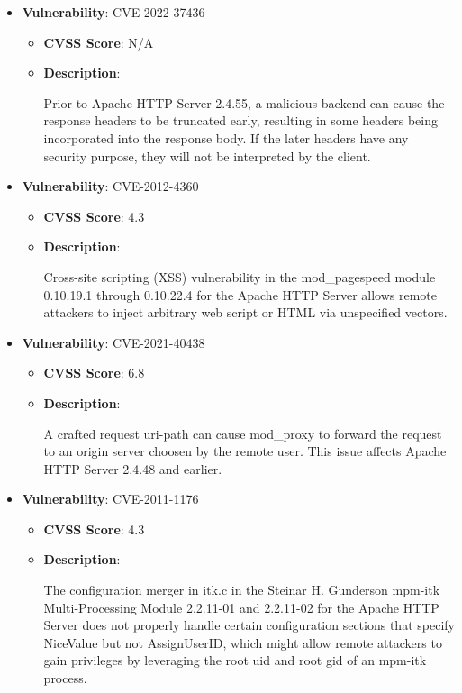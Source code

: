 \documentclass{article}
\begin{document}
\begin{itemize}
        \item \textbf{Vulnerability}: CVE-2022-37436
        \begin{itemize}
            \item \textbf{CVSS Score}:  N/A 
            \item \textbf{Description}:
            \parbox[t]{0.9\linewidth}{
                \ttfamily Prior to Apache HTTP Server 2.4.55, a malicious backend can cause the response headers to be truncated early, resulting in some headers being incorporated into the response body. If the later headers have any security purpose, they will not be interpreted by the client.
            }
        \end{itemize}
    
        \item \textbf{Vulnerability}: CVE-2012-4360
        \begin{itemize}
            \item \textbf{CVSS Score}:  4.3 
            \item \textbf{Description}:
            \parbox[t]{0.9\linewidth}{
                \ttfamily Cross-site scripting (XSS) vulnerability in the mod\_pagespeed module 0.10.19.1 through 0.10.22.4 for the Apache HTTP Server allows remote attackers to inject arbitrary web script or HTML via unspecified vectors.
            }
        \end{itemize}
    
        \item \textbf{Vulnerability}: CVE-2021-40438
        \begin{itemize}
            \item \textbf{CVSS Score}:  6.8 
            \item \textbf{Description}:
            \parbox[t]{0.9\linewidth}{
                \ttfamily A crafted request uri-path can cause mod\_proxy to forward the request to an origin server choosen by the remote user. This issue affects Apache HTTP Server 2.4.48 and earlier.
            }
        \end{itemize}
    
        \item \textbf{Vulnerability}: CVE-2011-1176
        \begin{itemize}
            \item \textbf{CVSS Score}:  4.3 
            \item \textbf{Description}:
            \parbox[t]{0.9\linewidth}{
                \ttfamily The configuration merger in itk.c in the Steinar H. Gunderson mpm-itk Multi-Processing Module 2.2.11-01 and 2.2.11-02 for the Apache HTTP Server does not properly handle certain configuration sections that specify NiceValue but not AssignUserID, which might allow remote attackers to gain privileges by leveraging the root uid and root gid of an mpm-itk process.
            }
        \end{itemize}
    

\end{itemize}
\end{document}

